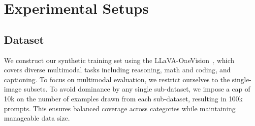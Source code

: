 \section{Experimental Setups}
\subsection{Dataset}
We construct our synthetic training set using the LLaVA-OneVision~\cite{li2024llavaonevisioneasyvisualtask}, which covers diverse multimodal tasks including reasoning, math and coding, and captioning. To focus on multimodal evaluation, we restrict ourselves to the single-image subsets.
To avoid dominance by any single sub-dataset, we impose a cap of 10k on the number of examples drawn from each sub-dataset, resulting in 100k prompts. This ensures balanced coverage across categories while maintaining manageable data size. 


